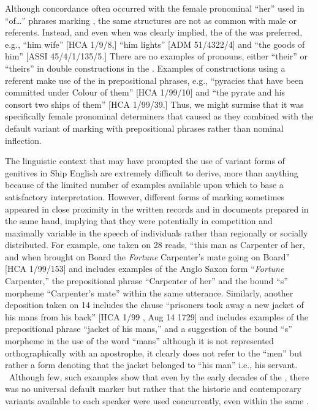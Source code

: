 Although  concordance often occurred with the  female pronominal  “her” used in “of…” phrases marking , the same structures are not as common with male or  referents. Instead, and even when  was clearly implied, the  of the  was preferred, e.g., “him wife” [HCA 1/9/8,] “him lights” [ADM 51/4322/4] and “the goods of him” [ASSI 45/4/1/135/5.] There are no examples of    pronouns, either “their” or “theirs” in double  constructions in the . Examples of constructions using a   referent make use of the  in prepositional phrases, e.g., “pyracies that have been committed under Colour of them” [HCA 1/99/10] and “the pyrate and his consort two ships of them” [HCA 1/99/39.] Thus, we might surmise that it was specifically female pronominal determiners that caused  as they combined with the default variant of marking  with prepositional phrases rather than nominal inflection. 

The linguistic context that may have prompted the use of variant forms of genitives in Ship English are extremely difficult to derive, more than anything because of the limited number of examples available upon which to base a satisfactory interpretation. However, different forms of marking  sometimes appeared in close proximity in the written records and in documents prepared in the same hand, implying that they were potentially in competition and maximally variable in the speech of individuals rather than regionally or socially distributed. For example, one  taken on 28 \citealt{March1722} reads, “this man as Carpenter of her, and when brought on Board the \textit{Fortune} Carpenter’s mate going on Board” [HCA 1/99/153] and includes examples of the Anglo Saxon  form “\textit{Fortune} Carpenter,” the prepositional  phrase “Carpenter of her” and the bound “s” morpheme “Carpenter’s mate” within the same utterance. Similarly, another deposition taken on 14 \citealt{August1729} includes the clause “prisoners took away a new jacket of his mans from his back” [HCA 1/99 , Aug 14 1729] and includes examples of the prepositional  phrase “jacket of his mans,” and a suggestion of the bound “s” morpheme in the use of the word “mans” although it is not represented orthographically with an apostrophe, it clearly does not refer to the  “men” but rather a  form denoting that the jacket belonged to “his man” i.e., his servant. ~Although few, such examples show that even by the early decades of the , there was no universal default  marker but rather that the historic and contemporary variants available to each speaker were used concurrently, even within the same . 

